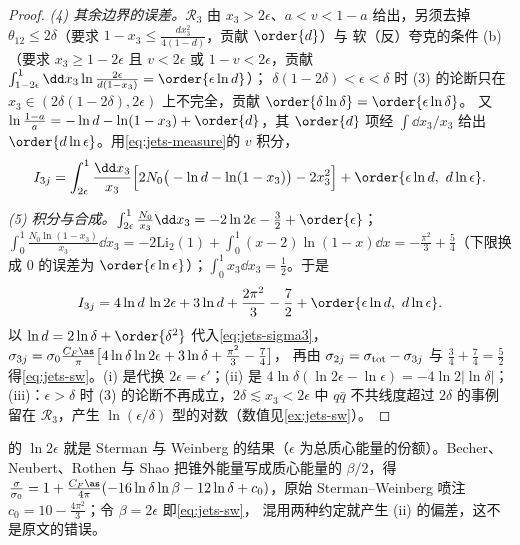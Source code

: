 \begin{proof}
\emph{(4) 其余边界的误差。}$\mathcal R_3$ 由 $x_3>2\epsilon$、$a<v<1-a$ 给出，另须去掉 $\theta_{12}\le2\delta$（要求 $1-x_3\le\frac{dx_3^2}{4(1-d)}$，贡献 $\order{d}$）与
软（反）夸克的条件 (b)（要求 $x_3\ge1-2\epsilon$ 且 $v<2\epsilon$ 或 $1-v<2\epsilon$，贡献 $\int_{1-2\epsilon}^1\dd x_3\ln\frac{2\epsilon}{d(1-x_3)}=\order{\epsilon\ln d}$）；
$\delta(1-2\delta)<\epsilon<\delta$ 时 (3) 的论断只在 $x_3\in(2\delta(1-2\delta),2\epsilon)$ 上不完全，贡献 $\order{\delta\ln\delta}=\order{\epsilon\ln\delta}$。
又 $\ln\frac{1-a}{a}=-\ln d-\ln(1-x_3)+\order{d}$，其 $\order{d}$ 项经 $\int\dd x_3/x_3$ 给出 $\order{d\ln\epsilon}$。用\cref{eq:jets-measure}的 $v$ 积分，
\begin{equation}\label{eq:jets-I3-asym}
I_{3j}=\int_{2\epsilon}^1\frac{\dd x_3}{x_3}\Big[2N_0\big(-\ln d-\ln(1-x_3)\big)-2x_3^2\Big]+\order{\epsilon\ln d,\ d\ln\epsilon}.
\end{equation}

\emph{(5) 积分与合成。}$\int_{2\epsilon}^1\frac{N_0}{x_3}\dd x_3=-2\ln2\epsilon-\frac32+\order{\epsilon}$；
$\int_0^1\frac{N_0\ln(1-x_3)}{x_3}\dd x_3=-2\mathrm{Li}_2(1)+\int_0^1(x-2)\ln(1-x)\dd x=-\frac{\pi^2}{3}+\frac54$（下限换成 $0$ 的误差为 $\order{\epsilon\ln\epsilon}$）；$\int_0^1x_3\dd x_3=\frac12$。于是
\begin{equation}\label{eq:jets-I3-result}
I_{3j}=4\ln d\,\ln2\epsilon+3\ln d+\frac{2\pi^2}{3}-\frac72+\order{\epsilon\ln d,\ d\ln\epsilon}.
\end{equation}
以 $\ln d=2\ln\delta+\order{\delta^2}$ 代入\cref{eq:jets-sigma3}，$\sigma_{3j}=\sigma_0\frac{C_F\as}{\pi}\big[4\ln\delta\ln2\epsilon+3\ln\delta+\frac{\pi^2}{3}-\frac74\big]$，
再由 $\sigma_{2j}=\sigma_{\rm tot}-\sigma_{3j}$ 与 $\frac34+\frac74=\frac52$ 得\cref{eq:jets-sw}。(i) 是代换 $2\epsilon=\epsilon'$；(ii) 是 $4\ln\delta(\ln2\epsilon-\ln\epsilon)=-4\ln2|\ln\delta|$；
(iii)：$\epsilon>\delta$ 时 (3) 的论断不再成立，$2\delta\lesssim x_3<2\epsilon$ 中 $q\bar q$ 不共线度超过 $2\delta$ 的事例留在 $\mathcal R_3$，产生 $\ln(\epsilon/\delta)$ 型的对数（数值见\cref{ex:jets-sw}）。
\end{proof}

的 $\ln2\epsilon$ 就是 Sterman 与 Weinberg 的结果（$\epsilon$ 为总质心能量的份额）。Becher、Neubert、Rothen 与 Shao 把锥外能量写成质心能量的 $\beta/2$，得
$\frac{\sigma}{\sigma_0}=1+\frac{C_F\as}{4\pi}(-16\ln\delta\ln\beta-12\ln\delta+c_0)$，原始 Sterman--Weinberg 喷注 $c_0=10-\frac{4\pi^2}{3}$\cite[式~(1)]{Becher:2015hka}；令 $\beta=2\epsilon$ 即\cref{eq:jets-sw}，
混用两种约定就产生 (ii) 的偏差，这不是原文的错误。

